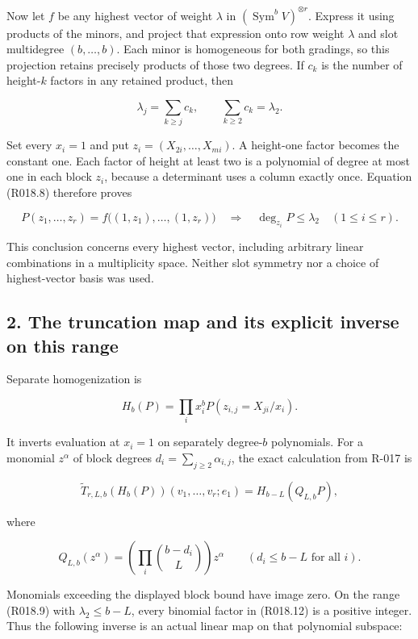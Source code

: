 \documentclass[
  10pt,
]{article}
\begin{document}
Now let \(f\) be any highest vector of weight \(\lambda\) in
\((\operatorname{Sym}^bV)^{\otimes r}\). Express it using products of
the minors, and project that expression onto row weight \(\lambda\) and
slot multidegree \((b,\ldots,b)\). Each minor is homogeneous for both
gradings, so this projection retains precisely products of those two
degrees. If \(c_k\) is the number of height-\(k\) factors in any
retained product, then

\[
\lambda_j=\sum_{k\ge j}c_k,
\qquad
\sum_{k\ge2}c_k=\lambda_2.
\tag{R018.8}
\]

Set every \(x_i=1\) and put \(z_i=(X_{2i},\ldots,X_{mi})\). A height-one
factor becomes the constant one. Each factor of height at least two is a
polynomial of degree at most one in each block \(z_i\), because a
determinant uses a column exactly once. Equation (R018.8) therefore
proves

\[
P(z_1,\ldots,z_r)=f\bigl((1,z_1),\ldots,(1,z_r)\bigr)
\quad\Longrightarrow\quad
\deg_{z_i}P\le\lambda_2\quad(1\le i\le r).
\tag{R018.9}
\]

This conclusion concerns every highest vector, including arbitrary
linear combinations in a multiplicity space. Neither slot symmetry nor a
choice of highest-vector basis was used.

\subsection{2. The truncation map and its explicit inverse on this
range}\label{the-truncation-map-and-its-explicit-inverse-on-this-range}

Separate homogenization is

\[
H_b(P)=\prod_i x_i^b P(z_{i,j}=X_{ji}/x_i).
\tag{R018.10}
\]

It inverts evaluation at \(x_i=1\) on separately degree-\(b\)
polynomials. For a monomial \(z^\alpha\) of block degrees
\(d_i=\sum_{j\ge2}\alpha_{i,j}\), the exact calculation from R-017 is

\[
\widetilde T_{r,L,b}(H_b(P))(v_1,\ldots,v_r;e_1)
 =H_{b-L}(Q_{L,b}P),
\tag{R018.11}
\]

where

\[
Q_{L,b}(z^\alpha)
 =\left(\prod_i\binom{b-d_i}{L}\right)z^\alpha
\qquad(d_i\le b-L\text{ for all }i).
\tag{R018.12}
\]

Monomials exceeding the displayed block bound have image zero. On the
range (R018.9) with \(\lambda_2\le b-L\), every binomial factor in
(R018.12) is a positive integer. Thus the following inverse is an actual
linear map on that polynomial subspace:
\end{document}
